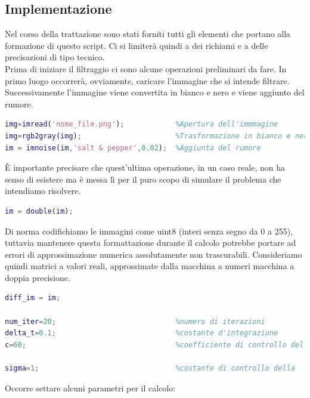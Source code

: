 \subsection{Implementazione}
Nel corso della trattazione sono stati forniti tutti gli elementi che portano alla formazione di questo script. Ci si limiterà quindi a dei richiami e a delle precisazioni di tipo tecnico.\\
\vspace{1em}
Prima di iniziare il filtraggio ci sono alcune operazioni preliminari da fare. In primo luogo occorrerà, ovviamente, caricare l'immagine che si intende filtrare. Successivamente l'immagine viene convertita in bianco e nero e viene aggiunto del rumore.\\
\begin{lstlisting}[language=MATLAB, name=listato]
img=imread('nome_file.png');            %Apertura dell'immmagine
img=rgb2gray(img);                      %Trasformazione in bianco e nero
im = imnoise(im,'salt & pepper',0.02);  %Aggiunta del rumore
\end{lstlisting}
\`E importante precisare che quest'ultima operazione, in un caso reale, non ha senso di esistere ma è messa lì per il puro scopo di simulare il problema che intendiamo risolvere.
\begin{lstlisting}[language=MATLAB, name=listato]
% conversione in double per il calcolo.
im = double(im);
\end{lstlisting}
Di norma codifichiamo le immagini come uint8 (interi senza segno da 0 a 255), tuttavia mantenere questa formattazione durante il calcolo potrebbe portare ad errori di approssimazione numerica assolutamente non trascurabili. Consideriamo quindi matrici a valori reali, approssimate dalla macchina a numeri macchina a doppia precisione. 
\begin{lstlisting}[language=MATLAB, name=listato]
% Condizioni iniziali della PDE.
diff_im = im;

num_iter=20;                            %numero di iterazioni
delta_t=0.1;                            %costante d'integrazione
c=60;                                   %coefficiente di controllo del                                       gradiente

sigma=1;                                %costante di controllo della                                         diffusione uniforme

\end{lstlisting}
Occorre settare alcuni parametri per il calcolo: 
